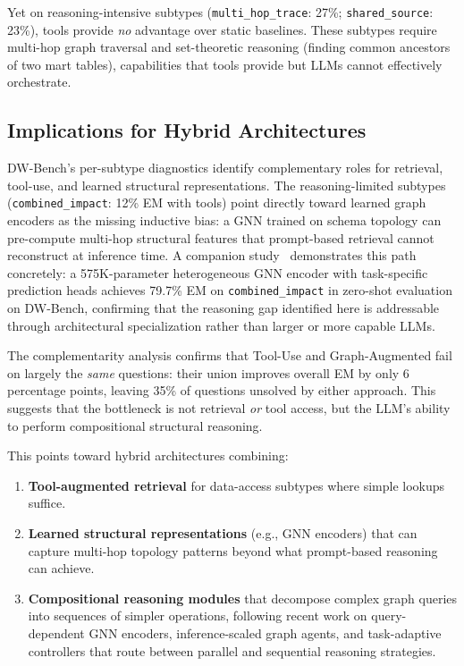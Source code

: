 Yet on reasoning-intensive subtypes (\texttt{multi\_hop\_trace}: 27\%;
\texttt{shared\_source}: 23\%), tools provide \emph{no} advantage over
static baselines.  These subtypes require multi-hop graph traversal
and set-theoretic reasoning (finding common ancestors of two mart
tables), capabilities that tools provide but LLMs cannot effectively
orchestrate.

\subsection{Implications for Hybrid Architectures}

DW-Bench's per-subtype diagnostics identify complementary roles for
retrieval, tool-use, and learned structural representations.
The reasoning-limited subtypes (\texttt{combined\_impact}: 12\% EM with
tools) point directly toward learned graph encoders as the missing
inductive bias: a GNN trained on schema topology can pre-compute
multi-hop structural features that prompt-based retrieval cannot
reconstruct at inference time.
A companion study~\cite{dwgnn} demonstrates this path concretely:
a 575K-parameter heterogeneous GNN encoder with task-specific prediction
heads achieves 79.7\% EM on \texttt{combined\_impact} in zero-shot
evaluation on DW-Bench, confirming that the reasoning gap identified
here is addressable through architectural specialization rather than
larger or more capable LLMs.

The complementarity analysis confirms that Tool-Use and Graph-Augmented
fail on largely the \emph{same} questions: their union improves overall
EM by only 6 percentage points, leaving 35\% of questions unsolved by
either approach.  This suggests that the bottleneck is not retrieval
\emph{or} tool access, but the LLM's ability to perform compositional
structural reasoning.

This points toward hybrid architectures combining:
\begin{enumerate}
  \item \textbf{Tool-augmented retrieval} for data-access subtypes
    where simple lookups suffice.
  \item \textbf{Learned structural representations} (e.g., GNN encoders)
    that can capture multi-hop topology patterns beyond what prompt-based
    reasoning can achieve.
  \item \textbf{Compositional reasoning modules} that decompose complex
    graph queries into sequences of simpler operations, following recent
    work on query-dependent GNN encoders, inference-scaled graph agents,
    and task-adaptive controllers that route between parallel and
    sequential reasoning strategies.
\end{enumerate}

